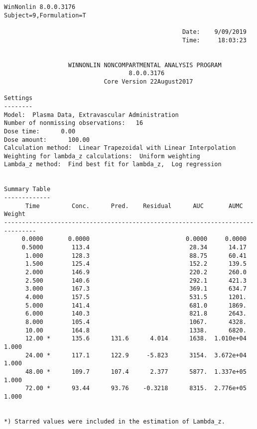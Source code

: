 \documentclass[12pt,a4paper]{article}
\begin{document}
\begin{verbatim}
WinNonlin 8.0.0.3176
Subject=9,Formulation=T

                                                  Date:    9/09/2019
                                                  Time:     18:03:23


                  WINNONLIN NONCOMPARTMENTAL ANALYSIS PROGRAM
                                   8.0.0.3176
                            Core Version 22August2017

Settings
--------
Model:  Plasma Data, Extravascular Administration
Number of nonmissing observations:   16
Dose time:      0.00
Dose amount:      100.00
Calculation method:  Linear Trapezoidal with Linear Interpolation
Weighting for lambda_z calculations:  Uniform weighting
Lambda_z method:  Find best fit for lambda_z,  Log regression


Summary Table
-------------
      Time         Conc.      Pred.    Residual      AUC       AUMC      Weight
-------------------------------------------------------------------------------
     0.0000       0.0000                           0.0000     0.0000
     0.5000        113.4                            28.34      14.17
      1.000        128.3                            88.75      60.41
      1.500        125.4                            152.2      139.5
      2.000        146.9                            220.2      260.0
      2.500        140.6                            292.1      421.3
      3.000        167.3                            369.1      634.7
      4.000        157.5                            531.5      1201.
      5.000        141.4                            681.0      1869.
      6.000        140.3                            821.8      2643.
      8.000        105.4                            1067.      4328.
      10.00        164.8                            1338.      6820.
      12.00 *      135.6      131.6      4.014      1638.  1.010e+04      1.000
      24.00 *      117.1      122.9     -5.823      3154.  3.672e+04      1.000
      48.00 *      109.7      107.4      2.377      5877.  1.337e+05      1.000
      72.00 *      93.44      93.76    -0.3218      8315.  2.776e+05      1.000


*) Starred values were included in the estimation of Lambda_z.



\end{verbatim}
\end{document}
